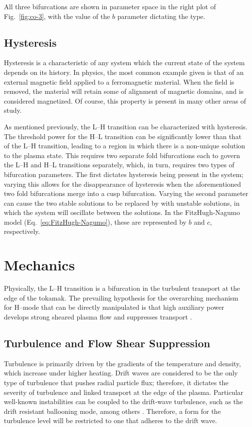All three bifurcations are shown in parameter space in the right plot of Fig.~\ref{fig:co-3}, with the value of the $b$ parameter dictating the type.

\subsection{Hysteresis}\label{ssec:hysteresis}
Hysteresis is a characteristic of any system which the current state of the system depends on its history.
In physics, the most common example given is that of an external magnetic field applied to a ferromagnetic material.
When the field is removed, the material will retain some of alignment of magnetic domains, and is considered magnetized.
Of course, this property is present in many other areas of study.

As mentioned previously, the L--H transition can be characterized with hysteresis.
The threshold power for the H--L transition can be significantly lower than that of the L--H transition, leading to a region in which there is a non-unique solution to the plasma state.
This requires two separate fold bifurcations each to govern the L--H and H--L transitions separately, which, in turn, requires two types of bifurcation parameters.
The first dictates hysteresis being present in the system; varying this allows for the disappearance of hysteresis when the aforementioned two fold bifurcations merge into a cusp bifurcation.
Varying the second parameter can cause the two stable solutions to be replaced by with unstable solutions, in which the system will oscillate between the solutions.
In the FitzHugh-Nagumo model (Eq.~\ref{eq:FitzHugh-Nagumo}), these are represented by $b$ and $c$, respectively.


\section{Mechanics}\label{sec:mechanics}
Physically, the L--H transition is a bifurcation in the turbulent transport at the edge of the tokamak.
The prevailing hypothesis for the overarching mechanism for H--mode that can be directly manipulated is that high auxiliary power develops strong sheared plasma flow and suppresses transport \cite{freidberg_plasma_2007}.

\subsection{Turbulence and Flow Shear Suppression}\label{ssec:turbulence_sheared}
Turbulence is primarily driven by the gradients of the temperature and density, which increase under higher heating.
Drift waves are considered to be the only type of turbulence that pushes radial particle flux; therefore, it dictates the severity of turbulence and linked transport at the edge of the plasma.
Particular well-known instabilities can be coupled to the drift-wave turbulence, such as the drift resistant ballooning mode, among others \cite{scott_three-dimensional_1997}.
Therefore, a form for the turbulence level will be restricted to one that adheres to the drift wave.

